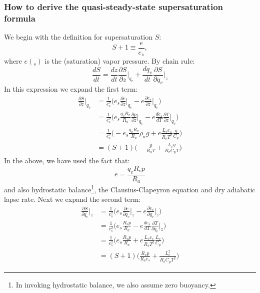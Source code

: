\documentclass{article}
\begin{document}
\subsubsection{How to derive the quasi-steady-state supersaturation formula}
We begin with the definition for supersaturation $S$:
\begin{equation}
S+1\equiv \frac{e}{e_s},
\end{equation}
where $e(_s)$ is the (saturation) vapor pressure. By chain rule:
\begin{equation}
\label{dsdt}
\frac{dS}{dt} = \frac{dz}{dt}\frac{\partial S}{\partial z}\Big\rvert_{q_v} + \frac{dq_v}{dt}\frac{\partial S}{\partial q_v}\Big\rvert_{z}
\end{equation}
In this expression we expand the first term:
\begin{align}
\label{partialz}
\frac{\partial S}{\partial z}\Big\rvert_{q_v} &= \frac{1}{e_s^2}\Big(e_s\frac{\partial e}{\partial z}\Big\rvert_{q_v} - e\frac{\partial e_s}{\partial z}\Big\rvert_{q_v}\Big)\nonumber\\
&=\frac{1}{e_s^2}\Big(e_s\frac{q_vR_v}{R_a}\frac{\partial p}{\partial z}\Big\rvert_{q_v} - e\frac{de_s}{dT}\frac{\partial T}{\partial z}\Big\rvert_{q_v}\Big)\nonumber\\
&=\frac{1}{e_s^2}\Big(-e_s\frac{q_vR_v}{R_a}\rho_a g + e\frac{L_ve_s}{R_vT^2}\frac{g}{C_p}\Big)\nonumber\\
&=(S+1)\Big(-\frac{g}{R_aT} + \frac{L_vg}{R_vC_pT}\Big)
\end{align}
In the above, we have used the fact that:
\begin{equation}
e = \frac{q_vR_vp}{R_a}
\end{equation}
and also hydrostatic balance\footnote{In invoking hydrostatic balance, we also assume zero buoyancy.}, the Clausius-Clapeyron equation and dry adiabatic lapse rate. Next we expand the second term:
\begin{align}
\label{partialqv}
\frac{\partial S}{\partial q_v}\Big\rvert_{z} &= \frac{1}{e_s^2}\Big(e_s\frac{\partial e}{\partial q_v}\Big\rvert_{z} - e\frac{\partial e_s}{\partial q_v}\Big\rvert_{z}\Big)\nonumber\\
&=\frac{1}{e_s^2}\Big(e_s\frac{R_vp}{R_a} - e\frac{de_s}{dT}\frac{\partial T}{\partial q_v}\Big\rvert_{z}\Big)\nonumber\\
&=\frac{1}{e_s^2}\Big(e_s\frac{R_vp}{R_a} + e\frac{L_ve_s}{R_vT^2}\frac{L_v}{C_p}\Big)\nonumber\\
&=(S+1)\Big(\frac{R_vp}{R_ae_s} + \frac{L_v^2}{R_vC_pT^2}\Big)
\end{align}
\end{document}
